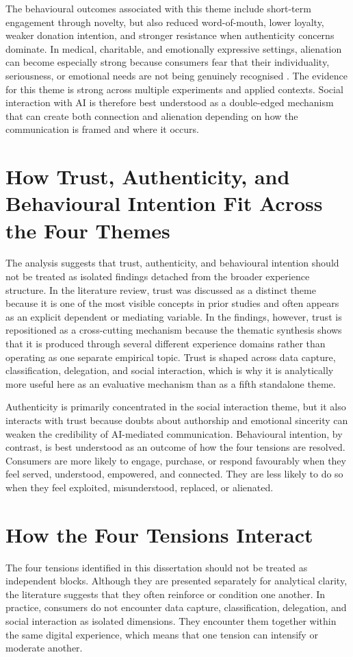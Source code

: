 The behavioural outcomes associated with this theme include short-term engagement through novelty, but also reduced word-of-mouth, lower loyalty, weaker donation intention, and stronger resistance when authenticity concerns dominate. In medical, charitable, and emotionally expressive settings, alienation can become especially strong because consumers fear that their individuality, seriousness, or emotional needs are not being genuinely recognised \cite{longoni2019medical}. The evidence for this theme is strong across multiple experiments and applied contexts. Social interaction with AI is therefore best understood as a double-edged mechanism that can create both connection and alienation depending on how the communication is framed and where it occurs.

\section{How Trust, Authenticity, and Behavioural Intention Fit Across the Four Themes}
The analysis suggests that trust, authenticity, and behavioural intention should not be treated as isolated findings detached from the broader experience structure. In the literature review, trust was discussed as a distinct theme because it is one of the most visible concepts in prior studies and often appears as an explicit dependent or mediating variable. In the findings, however, trust is repositioned as a cross-cutting mechanism because the thematic synthesis shows that it is produced through several different experience domains rather than operating as one separate empirical topic. Trust is shaped across data capture, classification, delegation, and social interaction, which is why it is analytically more useful here as an evaluative mechanism than as a fifth standalone theme.

Authenticity is primarily concentrated in the social interaction theme, but it also interacts with trust because doubts about authorship and emotional sincerity can weaken the credibility of AI-mediated communication. Behavioural intention, by contrast, is best understood as an outcome of how the four tensions are resolved. Consumers are more likely to engage, purchase, or respond favourably when they feel served, understood, empowered, and connected. They are less likely to do so when they feel exploited, misunderstood, replaced, or alienated.

\section{How the Four Tensions Interact}
The four tensions identified in this dissertation should not be treated as independent blocks. Although they are presented separately for analytical clarity, the literature suggests that they often reinforce or condition one another. In practice, consumers do not encounter data capture, classification, delegation, and social interaction as isolated dimensions. They encounter them together within the same digital experience, which means that one tension can intensify or moderate another.

